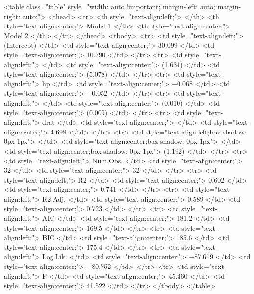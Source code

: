 <table class="table" style="width: auto !important; margin-left: auto; margin-right: auto;">
 <thead>
  <tr>
   <th style="text-align:left;">   </th>
   <th style="text-align:center;"> Model 1 </th>
   <th style="text-align:center;"> Model 2 </th>
  </tr>
 </thead>
<tbody>
  <tr>
   <td style="text-align:left;"> (Intercept) </td>
   <td style="text-align:center;"> 30.099 </td>
   <td style="text-align:center;"> 10.790 </td>
  </tr>
  <tr>
   <td style="text-align:left;">  </td>
   <td style="text-align:center;"> (1.634) </td>
   <td style="text-align:center;"> (5.078) </td>
  </tr>
  <tr>
   <td style="text-align:left;"> hp </td>
   <td style="text-align:center;"> −0.068 </td>
   <td style="text-align:center;"> −0.052 </td>
  </tr>
  <tr>
   <td style="text-align:left;">  </td>
   <td style="text-align:center;"> (0.010) </td>
   <td style="text-align:center;"> (0.009) </td>
  </tr>
  <tr>
   <td style="text-align:left;"> drat </td>
   <td style="text-align:center;">  </td>
   <td style="text-align:center;"> 4.698 </td>
  </tr>
  <tr>
   <td style="text-align:left;box-shadow: 0px 1px">  </td>
   <td style="text-align:center;box-shadow: 0px 1px">  </td>
   <td style="text-align:center;box-shadow: 0px 1px"> (1.192) </td>
  </tr>
  <tr>
   <td style="text-align:left;"> Num.Obs. </td>
   <td style="text-align:center;"> 32 </td>
   <td style="text-align:center;"> 32 </td>
  </tr>
  <tr>
   <td style="text-align:left;"> R2 </td>
   <td style="text-align:center;"> 0.602 </td>
   <td style="text-align:center;"> 0.741 </td>
  </tr>
  <tr>
   <td style="text-align:left;"> R2 Adj. </td>
   <td style="text-align:center;"> 0.589 </td>
   <td style="text-align:center;"> 0.723 </td>
  </tr>
  <tr>
   <td style="text-align:left;"> AIC </td>
   <td style="text-align:center;"> 181.2 </td>
   <td style="text-align:center;"> 169.5 </td>
  </tr>
  <tr>
   <td style="text-align:left;"> BIC </td>
   <td style="text-align:center;"> 185.6 </td>
   <td style="text-align:center;"> 175.4 </td>
  </tr>
  <tr>
   <td style="text-align:left;"> Log.Lik. </td>
   <td style="text-align:center;"> −87.619 </td>
   <td style="text-align:center;"> −80.752 </td>
  </tr>
  <tr>
   <td style="text-align:left;"> F </td>
   <td style="text-align:center;"> 45.460 </td>
   <td style="text-align:center;"> 41.522 </td>
  </tr>
</tbody>
</table>
